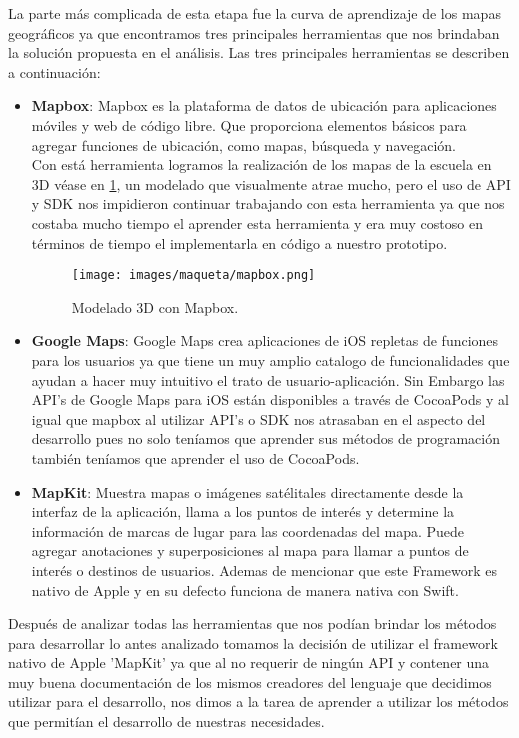 La parte más complicada de esta etapa fue la curva de aprendizaje de los mapas geográficos ya que encontramos tres principales herramientas que nos brindaban la solución propuesta en el análisis. Las tres principales herramientas se describen a continuación: 
\begin{itemize}
	\item \textbf{Mapbox}: Mapbox es la plataforma de datos de ubicación para aplicaciones móviles y web de código libre. Que proporciona  elementos básicos para agregar funciones de ubicación, como mapas, búsqueda y navegación.\\ Con está herramienta logramos la realización de los mapas de la escuela en 3D véase en \ref{mapbox}, un modelado que visualmente atrae mucho, pero el uso de API y SDK nos impidieron continuar trabajando con esta herramienta ya que nos costaba mucho tiempo el aprender esta herramienta y era muy costoso en términos de tiempo el implementarla en código a nuestro prototipo.
	
	\begin{figure}[h!]
		\begin{center}
			\texttt{[image: images/maqueta/mapbox.png]}
			\caption{Modelado 3D con Mapbox.}
			\label{mapbox}
		\end{center}
	\end{figure}
	\item  \textbf{Google Maps}: Google Maps crea aplicaciones de iOS repletas de funciones para los usuarios ya que tiene un muy amplio catalogo de funcionalidades que ayudan a hacer muy intuitivo el trato de usuario-aplicación. Sin Embargo las API's de Google Maps para iOS están disponibles a través de CocoaPods y al igual que mapbox al utilizar API's o SDK nos atrasaban en el aspecto del desarrollo pues no solo teníamos que aprender sus métodos de programación también teníamos que  aprender el uso de CocoaPods.
	\item \textbf{MapKit}: Muestra mapas o imágenes satélitales  directamente desde la interfaz de la aplicación, llama a los puntos de interés y determine la información de marcas de lugar para las coordenadas del mapa. Puede agregar anotaciones y superposiciones al mapa para llamar a puntos de interés o destinos de usuarios. Ademas de mencionar que este Framework es nativo de Apple y en su defecto funciona de manera nativa con Swift.
\end{itemize}
Después de analizar todas las herramientas que nos podían brindar los métodos para desarrollar lo antes analizado tomamos la decisión de utilizar el framework nativo de Apple 'MapKit' ya que al no requerir de ningún API y contener una muy buena documentación de los mismos creadores del lenguaje que decidimos utilizar para el desarrollo, nos dimos a la tarea de aprender a utilizar los métodos que permitían el desarrollo de nuestras necesidades.\\

